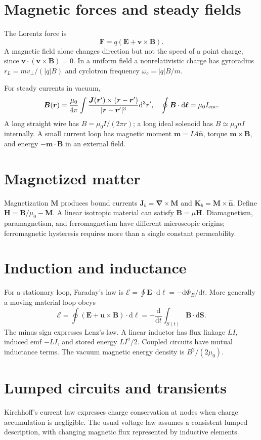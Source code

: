 \documentclass[11pt,oneside]{book}
\newcommand{\dd}{\mathrm{d}}
\newcommand{\vect}[1]{\boldsymbol{#1}}
\newcommand{\grad}{\boldsymbol{\nabla}}
\newcommand{\od}[2]{\frac{\dd #1}{\dd #2}}
\newcommand{\mun}{\mu_0}
\theoremstyle{reviewstyle}
\begin{document}
\section{Magnetic forces and steady fields}
The Lorentz force is
\begin{equation}\vect F=q(\vect E+\vect v\times\vect B).\end{equation}
A magnetic field alone changes direction but not the speed of a point charge, since $\vect v\cdot(\vect v\times\vect B)=0$. In a uniform field a nonrelativistic charge has gyroradius $r_L=mv_\perp/(|q|B)$ and cyclotron frequency $\omega_c=|q|B/m$.

For steady currents in vacuum,
\begin{equation}
\vect B(\vect r)=\frac{\mun}{4\pi}\int\frac{\vect J(\vect r')\times(\vect r-\vect r')}{|\vect r-\vect r'|^3}\dd^3r',
\quad \oint\vect B\cdot\dd\vect\ell=\mun I_{\rm enc}.
\end{equation}
A long straight wire has $B=\mun I/(2\pi r)$; a long ideal solenoid has $B\simeq\mun nI$ internally. A small current loop has magnetic moment $\vect m=IA\hat{\vect n}$, torque $\vect m\times\vect B$, and energy $-\vect m\cdot\vect B$ in an external field.
\section{Magnetized matter}
Magnetization $\vect M$ produces bound currents $\vect J_b=\grad\times\vect M$ and $\vect K_b=\vect M\times\hat{\vect n}$. Define $\vect H=\vect B/\mun-\vect M$. A linear isotropic material can satisfy $\vect B=\mu\vect H$. Diamagnetism, paramagnetism, and ferromagnetism have different microscopic origins; ferromagnetic hysteresis requires more than a single constant permeability.
\section{Induction and inductance}
For a stationary loop, Faraday's law is $\mathcal E=\oint\vect E\cdot\dd\vect\ell=-\dd\Phi_B/\dd t$. More generally a moving material loop obeys
\begin{equation}\mathcal E=\oint(\vect E+\vect u\times\vect B)\cdot\dd\vect\ell=-\od{}{t}\int_{S(t)}\vect B\cdot\dd\vect S.\end{equation}
The minus sign expresses Lenz's law. A linear inductor has flux linkage $LI$, induced emf $-L\dot I$, and stored energy $LI^2/2$. Coupled circuits have mutual inductance terms. The vacuum magnetic energy density is $B^2/(2\mun)$.
\section{Lumped circuits and transients}
Kirchhoff's current law expresses charge conservation at nodes when charge accumulation is negligible. The usual voltage law assumes a consistent lumped description, with changing magnetic flux represented by inductive elements.
\end{document}
